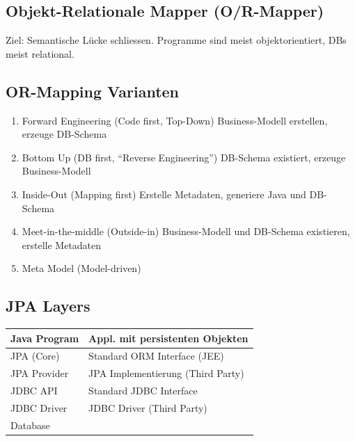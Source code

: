 \documentclass[a4paper, landscape, 8pt]{scrartcl}
\begin{document}
    \begin{multicols*}{4}
        \setlength{\columnseprule}{0.4pt}
        \footnotesize

        \section{Objekt-Relationale Mapper (O/R-Mapper)}
        Ziel: Semantische Lücke schliessen.
        Programme sind meist objektorientiert, DBs meist relational.

        \subsection{OR-Mapping Varianten}
        \begin{enumerate}
            \item Forward Engineering (Code first, Top-Down)
            \subitem Business-Modell erstellen, erzeuge DB-Schema
            \item Bottom Up (DB first, \enquote{Reverse Engineering})
            \subitem DB-Schema existiert, erzeuge Business-Modell
            \item Inside-Out (Mapping first)
            \subitem Erstelle Metadaten, generiere Java und DB-Schema
            \item Meet-in-the-middle (Outside-in)
            \subitem Business-Modell und DB-Schema existieren, erstelle Metadaten
            \item Meta Model (Model-driven)
        \end{enumerate}

        \subsection{JPA Layers}
        \begin{tabular}{l | l}
            \cellcolor{darkgreen!25} Java Program & Appl. mit persistenten Objekten \\
            \hline
            \cellcolor{Blue!25} JPA (Core) & Standard ORM Interface (JEE) \\
            \hline
            \cellcolor{darkgreen!25} JPA Provider & JPA Implementierung (Third Party) \\
            \hline
            \cellcolor{Blue!25} JDBC API & Standard JDBC Interface \\
            \hline
            \cellcolor{darkgreen!25} JDBC Driver & JDBC Driver (Third Party) \\
            \hline
            \cellcolor{gray!25} Database &
        \end{tabular}


\end{multicols*}
\end{document}
